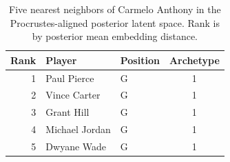 \begin{table}[htbp]
  \centering\small
  \begin{tabular}{rllc}
    \toprule
    Rank & Player & Position & Archetype \\
    \midrule
    1 & Paul Pierce & G & 1 \\
    2 & Vince Carter & G & 1 \\
    3 & Grant Hill & G & 1 \\
    4 & Michael Jordan & G & 1 \\
    5 & Dwyane Wade & G & 1 \\
    \bottomrule
  \end{tabular}
  \caption{Five nearest neighbors of Carmelo Anthony in the Procrustes-aligned posterior latent space. Rank is by posterior mean embedding distance.}
  \label{tab:Carmelo_Anthony_neighbors}
\end{table}

